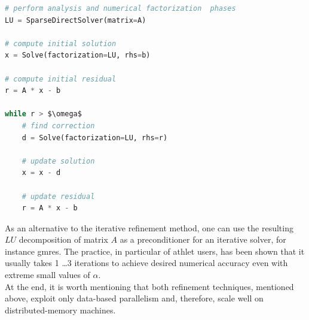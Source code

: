 \begin{minipage}{\linewidth}

\begin{lstlisting}[language=python, caption={Pseudocode of an iterative refinement method}, frame=single, label={lst:iterative-refinement}]
# perform analysis and numerical factorization  phases
LU = SparseDirectSolver(matrix=A)

# compute initial solution
x = Solve(factorization=LU, rhs=b)

# compute initial residual
r = A * x - b

while r > $\omega$
	# find correction
	d = Solve(factorization=LU, rhs=r)
	
	# update solution
	x = x - d
	
	# update residual
	r = A * x - b
\end{lstlisting}
\end{minipage}


As an alternative to the iterative refinement method, one can use the resulting $LU$ decomposition of matrix $A$ as a preconditioner for an iterative solver, for instance \acrshort{gmres}. The practice, in particular of \acrshort{athlet} users, has been shown that it usually takes 1 \dots 3 iterations to achieve desired numerical accuracy even with extreme small values of $\alpha$.\\

At the end, it is worth mentioning that both refinement techniques, mentioned above, exploit only data-based parallelism and, therefore, scale well on distributed-memory machines.\\
